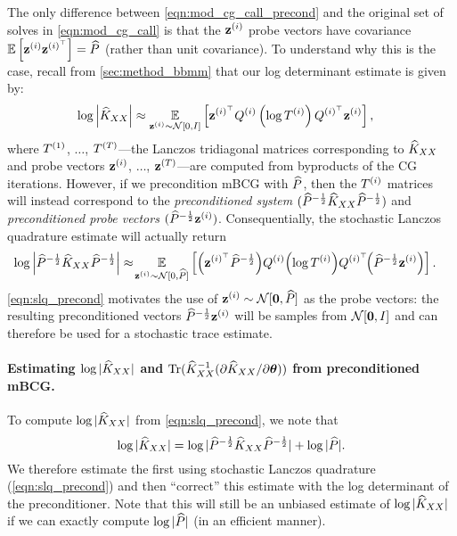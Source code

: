 The only difference between \cref{eqn:mod_cg_call_precond} and the original set of solves in \cref{eqn:mod_cg_call}
is that the $\mathbf{z}^{(i)}$ probe vectors have covariance $\operatorname*{\mathbb{E}} \left[  \mathbf{z}^{(i)} \mathbf{z}^{(i)^\top}  \right] = \widehat{P}$ (rather than unit covariance).
To understand why this is the case, recall from \cref{sec:method_bbmm} that our log determinant estimate is given by:
%
\begin{align*}
	\log \left\vert \trainK \right\vert
	&\approx \Evover{\bz^{(i)} \sim \normaldist{0}{\bI} }{\bz^{(i)^\top} \bQ^{(i)} \left( \log \bT^{(i)} \right) \bQ^{(i)^\top} \bz^{(i)}},
\end{align*}
%
where $T^{(1)}$, $\ldots$, $T^{(T)}$---the Lanczos tridiagonal matrices corresponding to $\widehat{K}_{XX}$ and probe vectors $\mathbf{z}^{(i)}$, $\ldots$, $\mathbf{z}^{(T)}$---are computed from byproducts of the CG iterations.
However, if we precondition mBCG with $\widehat{P}$, then the $T^{(i)}$ matrices will instead correspond to the \emph{preconditioned system}
$(\widehat{P}^{- \frac 1 2} \widehat{K}_{XX} \widehat{P}^{- \frac 1 2})$ and \emph{preconditioned probe vectors} $(\widehat{P}^{- \frac 1 2} \mathbf{z}^{(i)})$.
Consequentially, the stochastic Lanczos quadrature estimate will actually return
%
\begin{align}
	\log \left\vert \trainP^{- \frac 1 2} \trainK \trainP^{- \frac 1 2} \right\vert
	&\approx \!
	\Evover{\bz^{(i)} \sim \normaldist{0}{\trainP} }{
		\left( \bz^{(i)^\top} \trainP^{-\frac 1 2} \right) \!
		\bQ^{(i)} \! \left( \log \bT^{(i)} \right) \! \bQ^{(i)^\top}
		\!\! \left( \trainP^{-\frac 1 2} \bz^{(i)} \right)
	}.
	\label{eqn:slq_precond}
\end{align}
%
\cref{eqn:slq_precond} motivates the use of $\bz^{(i)} \sim \normaldist{\bzero}{\trainP}$ as the probe vectors:
the resulting preconditioned vectors $\widehat{P}^{- \frac 1 2} \mathbf{z}^{(i)}$ will be samples from $\normaldist{\bzero}{\bI}$ and can therefore be used for a stochastic trace estimate.

\paragraph{Estimating $\log \vert \widehat{K}_{XX} \vert$ and $\tr{ \trainK^{-1} (\partial \trainK / \partial \btheta) }$ from preconditioned mBCG.}
To compute $\log \vert \widehat{K}_{XX} \vert$ from \cref{eqn:slq_precond}, we note that
\[
\log \vert \widehat{K}_{XX} \vert = \log \vert \widehat{P}^{- \frac 1 2} \widehat{K}_{XX} \widehat{P}^{- \frac 1 2} \vert + \log \vert \widehat{P} \vert.
\]
We therefore estimate the first using stochastic Lanczos quadrature (\cref{eqn:slq_precond}) and then ``correct'' this estimate with the log determinant of the preconditioner.
Note that this will still be an unbiased estimate of $\log \vert \widehat{K}_{XX} \vert$ if we can exactly compute $\log \vert \widehat{P} \vert$ (in an efficient manner).

